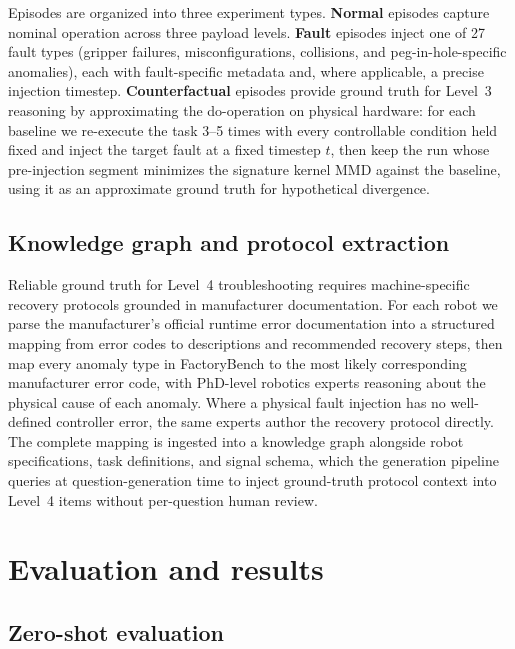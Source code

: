 Episodes are organized into three experiment types. \textbf{Normal} episodes capture nominal operation across three payload levels. \textbf{Fault} episodes inject one of 27 fault types (gripper failures, misconfigurations, collisions, and peg-in-hole-specific anomalies), each with fault-specific metadata and, where applicable, a precise injection timestep. \textbf{Counterfactual} episodes provide ground truth for Level~3 reasoning by approximating the do-operation on physical hardware: for each baseline we re-execute the task 3--5 times with every controllable condition held fixed and inject the target fault at a fixed timestep $t$, then keep the run whose pre-injection segment minimizes the signature kernel MMD against the baseline, using it as an approximate ground truth for hypothetical divergence.

\subsection{Knowledge graph and protocol extraction}
\label{sec:knowledge-graph}

Reliable ground truth for Level~4 troubleshooting requires machine-specific recovery protocols grounded in manufacturer documentation. For each robot we parse the manufacturer's official runtime error documentation into a structured mapping from error codes to descriptions and recommended recovery steps, then map every anomaly type in FactoryBench to the most likely corresponding manufacturer error code, with PhD-level robotics experts reasoning about the physical cause of each anomaly. Where a physical fault injection has no well-defined controller error, the same experts author the recovery protocol directly. The complete mapping is ingested into a knowledge graph alongside robot specifications, task definitions, and signal schema, which the generation pipeline queries at question-generation time to inject ground-truth protocol context into Level~4 items without per-question human review.

\section{Evaluation and results}

\subsection{Zero-shot evaluation}
\label{sec:zero-shot}

